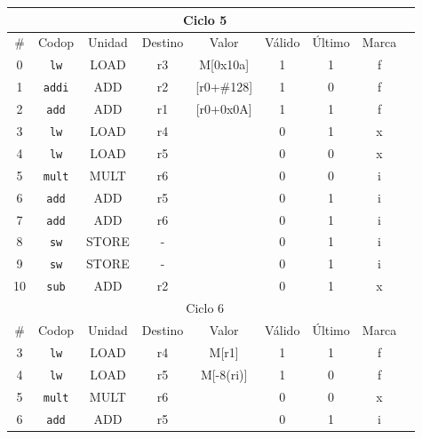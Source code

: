 \begin{ejercicio}
    \begin{table}[H]
        \centering
        \scriptsize
        \begin{tabular}{|c|c|c|c|c|c|c|c|c|}
            \hline
            \multicolumn{8}{|c|}{Ciclo 5} \\
            \hline
            \# & Codop      & Unidad & Destino & Valor & Válido & Último & Marca \\ \hline
            0  & \verb|lw|  & LOAD   & r3      &  M[0x10a]  & 1 & 1      & f     \\ \hline
            1  & \verb|addi|& ADD    & r2      & [r0+\#128] & 1 & 0      & f     \\ \hline
            2  & \verb|add| & ADD    & r1      & [r0+0x0A]  & 1 & 1      & f     \\ \hline
            3  & \verb|lw|  & LOAD   & r4      &       & 0      & 1      & x     \\ \hline
            4  & \verb|lw|  & LOAD   & r5      &       & 0      & 0      & x     \\ \hline
            5  & \verb|mult|& MULT   & r6      &       & 0      & 0      & i     \\ \hline
            6  & \verb|add| & ADD    & r5      &       & 0      & 1      & i     \\ \hline
            7  & \verb|add| & ADD    & r6      &       & 0      & 1      & i     \\ \hline
            8  & \verb|sw|  & STORE  & -       &       & 0      & 1      & i     \\ \hline
            9  & \verb|sw|  & STORE  & -       &       & 0      & 1      & i     \\ \hline
            10 & \verb|sub| & ADD    & r2      &       & 0      & 1      & x     \\ \hline\hline
            \multicolumn{8}{|c|}{Ciclo 6} \\
            \hline
            \# & Codop      & Unidad & Destino & Valor & Válido & Último & Marca \\ \hline
            3  & \verb|lw|  & LOAD   & r4      & M[r1] & 1      & 1      & f     \\ \hline
            4  & \verb|lw|  & LOAD   & r5      & M[-8(ri)] & 1  & 0      & f     \\ \hline
            5  & \verb|mult|& MULT   & r6      &       & 0      & 0      & x     \\ \hline
            6  & \verb|add| & ADD    & r5      &       & 0      & 1      & i     \\ \hline

\end{tabular}
\end{table}
\end{ejercicio}
